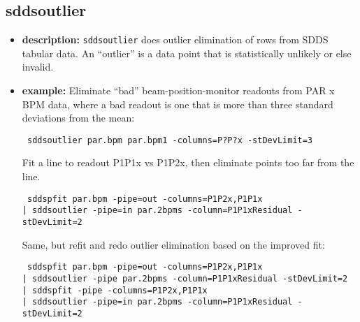 \newpage
\subsection{sddsoutlier}
\label{sddsoutlier}

\begin{itemize}
\item {\bf description:}
{\tt sddsoutlier} does outlier elimination of rows from SDDS tabular
data.  An ``outlier'' is a data point that is statistically unlikely
or else invalid.
\item {\bf example:}
Eliminate ``bad'' beam-position-monitor readouts from PAR x BPM data, where
a bad readout is one that is more than three standard deviations from the
mean:
\begin{flushleft}{\tt
sddsoutlier par.bpm par.bpm1 -columns=P?P?x -stDevLimit=3
}\end{flushleft}
Fit a line to readout P1P1x vs P1P2x, then eliminate points too far from the line.
\begin{flushleft}{\tt
sddspfit par.bpm -pipe=out -columns=P1P2x,P1P1x \\
| sddsoutlier -pipe=in par.2bpms -column=P1P1xResidual -stDevLimit=2
}\end{flushleft}
Same, but refit and redo outlier elimination based on the improved fit:
\begin{flushleft}{\tt
sddspfit par.bpm -pipe=out -columns=P1P2x,P1P1x \\
| sddsoutlier -pipe par.2bpms -column=P1P1xResidual -stDevLimit=2 \\
| sddspfit -pipe -columns=P1P2x,P1P1x \\
| sddsoutlier -pipe=in par.2bpms -column=P1P1xResidual -stDevLimit=2 
}\end{flushleft}


\end{itemize}
